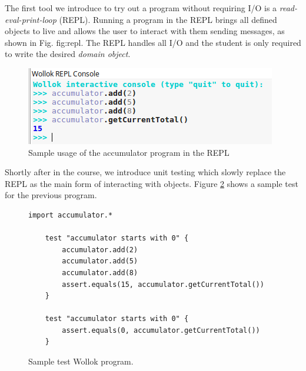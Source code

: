 The first tool we introduce to try out a program without requiring I/O is a \emph {read-eval-print-loop} (REPL). Running a program in the REPL brings all defined objects to live and allows the user to interact with them sending messages, as shown in Fig. {fig:repl}. 
The REPL handles all I/O and the student is only required to write the desired \emph{domain object}.

\begin{figure}[ht]
 \centering
 \includegraphics[scale=0.6]{images/accumulator-repl.png}
 \caption{\small Sample usage of the accumulator program in the REPL}
 \label{fig:repl}
\end{figure}




Shortly after in the course, we introduce unit testing which slowly replace the REPL as the main form of interacting with objects. Figure \ref{fig:test} shows a sample test for the previous program. 

\begin{figure}[ht]
 \centering
 \begin{lstlisting}[language=Wollok]
 	import accumulator.*

	test "accumulator starts with 0" {
		accumulator.add(2)
		accumulator.add(5)
		accumulator.add(8)
		assert.equals(15, accumulator.getCurrentTotal())		
	}
   
	test "accumulator starts with 0" {
		assert.equals(0, accumulator.getCurrentTotal())
	}
 \end{lstlisting}
 
 \caption{\small Sample test Wollok program.}
 \label{fig:test}
\end{figure}

